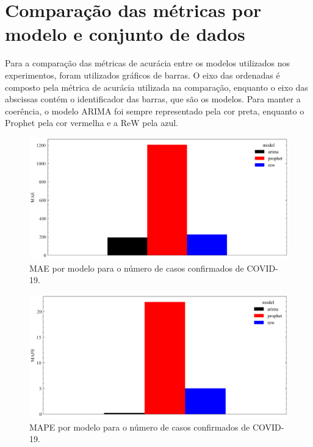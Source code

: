 \chapter{Comparação das métricas por modelo e conjunto de dados}
\label{apen:a}

Para a comparação das métricas de acurácia entre os modelos utilizados nos experimentos, foram utilizados gráficos de barras. O eixo das ordenadas é composto pela métrica de acurácia utilizada na comparação, enquanto o eixo das abscissas contém o identificador das barras, que são os modelos. Para manter a coerência, o modelo ARIMA foi sempre representado pela cor preta, enquanto o Prophet pela cor vermelha e a ReW pela azul.

\begin{figure}[!htp]
    \centering
    \includegraphics[width=5.0in]{img/covid_mae_comparison.pdf}
    \caption{MAE por modelo para o número de casos confirmados de COVID-19.}
\end{figure}

\begin{figure}[!htp]
    \centering
    \includegraphics[width=5.0in]{img/covid_mape_comparison.pdf}
    \caption{MAPE por modelo para o número de casos confirmados de COVID-19.}
\end{figure}

